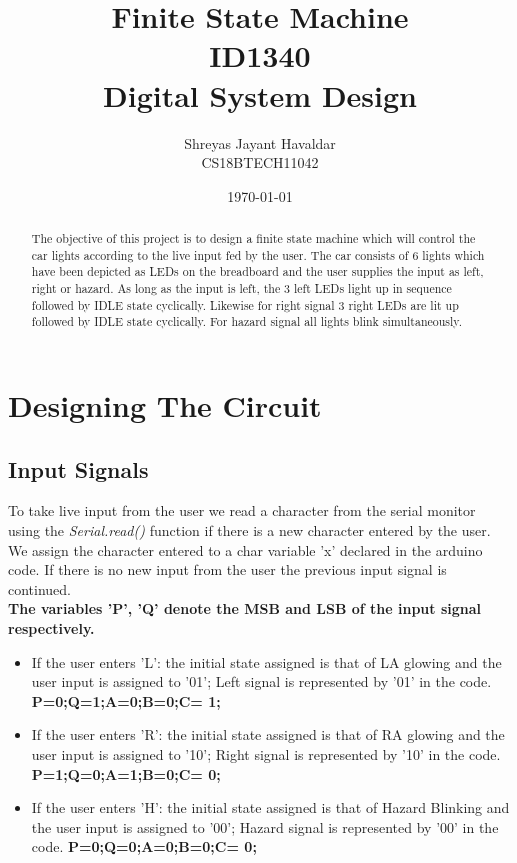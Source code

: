 \documentclass[12pt, letterpaper]{report}
\title {Finite State Machine \\  ID1340 \\Digital System Design}
\author{Shreyas Jayant Havaldar \\  CS18BTECH11042 }
\date{\today}
\begin{document}
\maketitle

\tableofcontents

\begin{abstract}

The objective of this project is to design a finite state machine which will control the car lights according to the live input fed by the user. The car consists of 6 lights which have been depicted as LEDs on the breadboard and the user supplies the input as left, right or hazard. As long as the input is left, the 3 left LEDs light up in sequence followed by IDLE state cyclically. Likewise for right signal 3 right LEDs are lit up followed by IDLE state cyclically. For hazard signal all lights blink simultaneously. 

\end{abstract}

\chapter{Designing The Circuit}
\section{Input Signals}
To take live input from the user we read a character from the serial monitor using the \textit{Serial.read()} function if there is a new character entered by the user. We assign the character entered to a char variable 'x' declared in the arduino code. If there is no new input from the user the previous input signal is continued. \\ 
\textbf{The variables 'P', 'Q' denote the MSB and LSB of the input signal respectively.}


\begin{itemize}


 \item If the user enters 'L': the initial state assigned is that of LA glowing and the user input is assigned to '01'; Left signal is represented by '01' in the code. \textbf{P=0;Q=1;A=0;B=0;C= 1;}
  \item If the user enters 'R': the initial state assigned is that of RA glowing and the user input is assigned to '10'; Right signal is represented by '10' in the code. \textbf{P=1;Q=0;A=1;B=0;C= 0;}
  \item If the user enters 'H': the initial state assigned is that of Hazard Blinking and the user input is assigned to '00'; Hazard signal is represented by '00' in the code. \textbf{P=0;Q=0;A=0;B=0;C= 0;}
  
  
\end{itemize}
\end{document}
